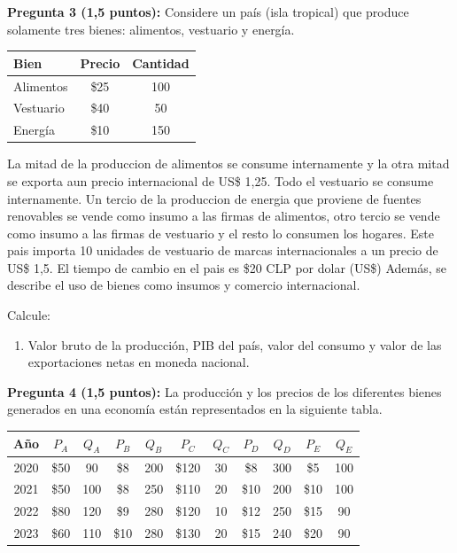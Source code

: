 \documentclass[11pt,addpoints]{article}
\begin{document}
\textbf{Pregunta 3 (1,5 puntos):}  
Considere un país (isla tropical) que produce solamente tres bienes: alimentos, vestuario y energía.  
\begin{center}
\begin{tabular}{lcc}
\toprule
\textbf{Bien} & \textbf{Precio} & \textbf{Cantidad} \\
\midrule
Alimentos & \$25 & 100 \\
Vestuario & \$40 & 50 \\
Energía   & \$10 & 150 \\
\bottomrule
\end{tabular}
\end{center}
La mitad de la produccion de alimentos se consume internamente y la otra mitad se exporta aun precio internacional de US\$ 1,25. Todo el vestuario se consume internamente. Un tercio de la produccion de energia que proviene de fuentes renovables se vende como insumo a las firmas de alimentos, otro tercio se vende como insumo a las firmas de vestuario y el resto lo consumen los hogares. Este pais importa 10 unidades de vestuario de marcas internacionales a un precio de US\$ 1,5. El tiempo de cambio en el pais es \$20 CLP por dolar (US\$)
Además, se describe el uso de bienes como insumos y comercio internacional.  
\vspace*{0.3cm}

Calcule:
\begin{enumerate}[label=\alph*)]
    \item Valor bruto de la producción, PIB del país, valor del consumo y valor de las exportaciones netas en moneda nacional.
\end{enumerate}



\textbf{Pregunta 4 (1,5 puntos):}  
La producción y los precios de los diferentes bienes generados en una economía están representados en la siguiente tabla.

\begin{center}
\begin{tabular}{c c c c c c c c c c c}
\toprule
\textbf{Año} & $P_A$ & $Q_A$ & $P_B$ & $Q_B$ & $P_C$ & $Q_C$ & $P_D$ & $Q_D$ & $P_E$ & $Q_E$ \\
\midrule
2020 & \$50 & 90  & \$8  & 200 & \$120 & 30 & \$8  & 300 & \$5  & 100 \\
2021 & \$50 & 100 & \$8  & 250 & \$110 & 20 & \$10 & 200 & \$10 & 100 \\
2022 & \$80 & 120 & \$9  & 280 & \$120 & 10 & \$12 & 250 & \$15 & 90  \\
2023 & \$60 & 110 & \$10 & 280 & \$130 & 20 & \$15 & 240 & \$20 & 90  \\
\bottomrule
\end{tabular}
\end{center}
\end{document}
